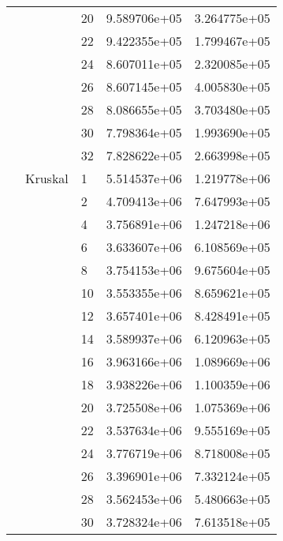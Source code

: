 \begin{tabular}{lllrr}
                      &            & 20 &  9.589706e+05 &  3.264775e+05 \\
                      &            & 22 &  9.422355e+05 &  1.799467e+05 \\
                      &            & 24 &  8.607011e+05 &  2.320085e+05 \\
                      &            & 26 &  8.607145e+05 &  4.005830e+05 \\
                      &            & 28 &  8.086655e+05 &  3.703480e+05 \\
                      &            & 30 &  7.798364e+05 &  1.993690e+05 \\
                      &            & 32 &  7.828622e+05 &  2.663998e+05 \\
                      & Kruskal & 1  &  5.514537e+06 &  1.219778e+06 \\
                      &            & 2  &  4.709413e+06 &  7.647993e+05 \\
                      &            & 4  &  3.756891e+06 &  1.247218e+06 \\
                      &            & 6  &  3.633607e+06 &  6.108569e+05 \\
                      &            & 8  &  3.754153e+06 &  9.675604e+05 \\
                      &            & 10 &  3.553355e+06 &  8.659621e+05 \\
                      &            & 12 &  3.657401e+06 &  8.428491e+05 \\
                      &            & 14 &  3.589937e+06 &  6.120963e+05 \\
                      &            & 16 &  3.963166e+06 &  1.089669e+06 \\
                      &            & 18 &  3.938226e+06 &  1.100359e+06 \\
                      &            & 20 &  3.725508e+06 &  1.075369e+06 \\
                      &            & 22 &  3.537634e+06 &  9.555169e+05 \\
                      &            & 24 &  3.776719e+06 &  8.718008e+05 \\
                      &            & 26 &  3.396901e+06 &  7.332124e+05 \\
                      &            & 28 &  3.562453e+06 &  5.480663e+05 \\
                      &            & 30 &  3.728324e+06 &  7.613518e+05 \\

\end{tabular}
